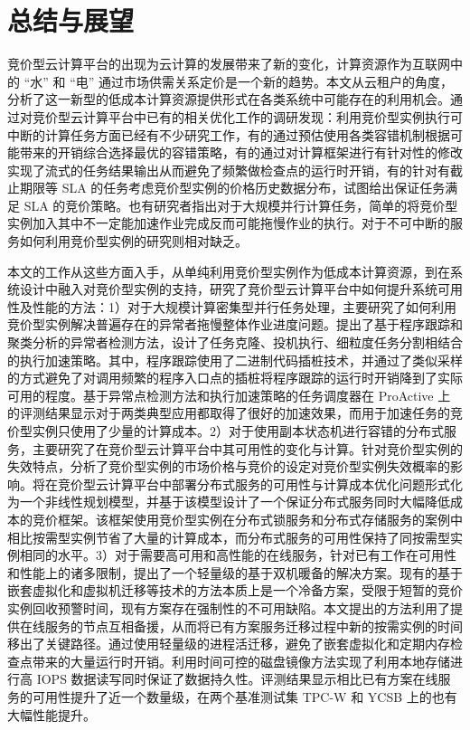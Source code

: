\chapter{总结与展望}
\label{cha:conclusion_futruework}
竞价型云计算平台的出现为云计算的发展带来了新的变化，计算资源作为互联网中的 ``水'' 和 ``电'' 通过市场供需关系定价是一个新的趋势。本文从云租户的角度，分析了这一新型的低成本计算资源提供形式在各类系统中可能存在的利用机会。通过对竞价型云计算平台中已有的相关优化工作的调研发现：利用竞价型实例执行可中断的计算任务方面已经有不少研究工作，有的通过预估使用各类容错机制根据可能带来的开销综合选择最优的容错策略，有的通过对计算框架进行有针对性的修改实现了流式的任务结果输出从而避免了频繁做检查点的运行时开销，有的针对有截止期限等 SLA 的任务考虑竞价型实例的价格历史数据分布，试图给出保证任务满足 SLA 的竞价策略。也有研究者指出对于大规模并行计算任务，简单的将竞价型实例加入其中不一定能加速作业完成反而可能拖慢作业的执行。对于不可中断的服务如何利用竞价型实例的研究则相对缺乏。

本文的工作从这些方面入手，从单纯利用竞价型实例作为低成本计算资源，到在系统设计中融入对竞价型实例的支持，研究了竞价型云计算平台中如何提升系统可用性及性能的方法：1）对于大规模计算密集型并行任务处理，主要研究了如何利用竞价型实例解决普遍存在的异常者拖慢整体作业进度问题。提出了基于程序跟踪和聚类分析的异常者检测方法，设计了任务克隆、投机执行、细粒度任务分割相结合的执行加速策略。其中，程序跟踪使用了二进制代码插桩技术，并通过了类似采样的方式避免了对调用频繁的程序入口点的插桩将程序跟踪的运行时开销降到了实际可用的程度。基于异常点检测方法和执行加速策略的任务调度器在 ProActive 上的评测结果显示对于两类典型应用都取得了很好的加速效果，而用于加速任务的竞价型实例只使用了少量的计算成本。2）对于使用副本状态机进行容错的分布式服务，主要研究了在竞价型云计算平台中其可用性的变化与计算。针对竞价型实例的失效特点，分析了竞价型实例的市场价格与竞价的设定对竞价型实例失效概率的影响。将在竞价型云计算平台中部署分布式服务的可用性与计算成本优化问题形式化为一个非线性规划模型，并基于该模型设计了一个保证分布式服务同时大幅降低成本的竞价框架。该框架使用竞价型实例在分布式锁服务和分布式存储服务的案例中相比按需型实例节省了大量的计算成本，而分布式服务的可用性保持了同按需型实例相同的水平。3）对于需要高可用和高性能的在线服务，针对已有工作在可用性和性能上的诸多限制，提出了一个轻量级的基于双机暖备的解决方案。现有的基于嵌套虚拟化和虚拟机迁移等技术的方法本质上是一个冷备方案，受限于短暂的竞价实例回收预警时间，现有方案存在强制性的不可用缺陷。本文提出的方法利用了提供在线服务的节点互相备援，从而将已有方案服务迁移过程中新的按需实例的时间移出了关键路径。通过使用轻量级的进程活迁移，避免了嵌套虚拟化和定期内存检查点带来的大量运行时开销。利用时间可控的磁盘镜像方法实现了利用本地存储进行高 IOPS 数据读写同时保证了数据持久性。评测结果显示相比已有方案在线服务的可用性提升了近一个数量级，在两个基准测试集 TPC-W 和 YCSB 上的也有大幅性能提升。

